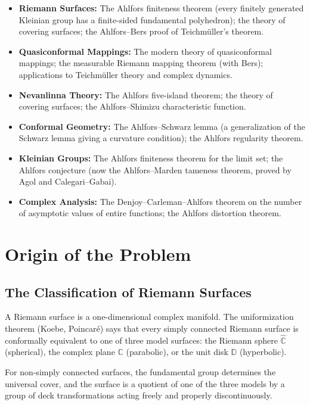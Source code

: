 \begin{itemize}
    \item \textbf{Riemann Surfaces:} The Ahlfors finiteness theorem (every finitely generated Kleinian group has a finite-sided fundamental polyhedron); the theory of covering surfaces; the Ahlfors--Bers proof of Teichm{\"u}ller's theorem.
    \item \textbf{Quasiconformal Mappings:} The modern theory of quasiconformal mappings; the measurable Riemann mapping theorem (with Bers); applications to Teichm{\"u}ller theory and complex dynamics.
    \item \textbf{Nevanlinna Theory:} The Ahlfors five-island theorem; the theory of covering surfaces; the Ahlfors--Shimizu characteristic function.
    \item \textbf{Conformal Geometry:} The Ahlfors--Schwarz lemma (a generalization of the Schwarz lemma giving a curvature condition); the Ahlfors regularity theorem.
    \item \textbf{Kleinian Groups:} The Ahlfors finiteness theorem for the limit set; the Ahlfors conjecture (now the Ahlfors--Marden tameness theorem, proved by Agol and Calegari--Gabai).
    \item \textbf{Complex Analysis:} The Denjoy--Carleman--Ahlfors theorem on the number of asymptotic values of entire functions; the Ahlfors distortion theorem.
\end{itemize}

\section{Origin of the Problem}

\subsection{The Classification of Riemann Surfaces}

A Riemann surface is a one-dimensional complex manifold. The uniformization theorem (Koebe, Poincar{\'e}) says that every simply connected Riemann surface is conformally equivalent to one of three model surfaces: the Riemann sphere $\widehat{\mathbb{C}}$ (spherical), the complex plane $\mathbb{C}$ (parabolic), or the unit disk $\mathbb{D}$ (hyperbolic).

For non-simply connected surfaces, the fundamental group determines the universal cover, and the surface is a quotient of one of the three models by a group of deck transformations acting freely and properly discontinuously.

